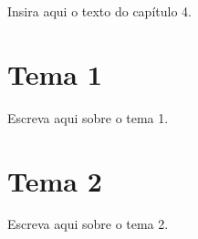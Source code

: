 \label{sec:capitulo04}

Insira aqui o texto do capítulo 4.


\section{Tema 1}

Escreva aqui sobre o tema 1.


\section{Tema 2}

Escreva aqui sobre o tema 2.